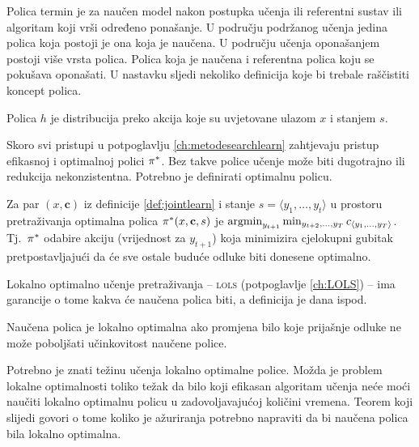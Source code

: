 Polica  termin je za naučen model nakon postupka učenja ili
referentni sustav ili algoritam koji vrši određeno ponašanje. U području
podržanog učenja jedina polica koja postoji je ona koja je naučena. U području
učenja oponašanjem  postoji više vrsta polica. Polica
koja je naučena i referentna polica koju se pokušava oponašati. U nastavku
sljedi nekoliko definicija koje bi trebale raščistiti koncept polica.

\begin{definition}[Polica]

  Polica $h$ je distribucija preko akcija koje su uvjetovane ulazom $x$ i
  stanjem $s$.

\end{definition}

\noindent
Skoro svi pristupi u potpoglavlju \ref{ch:metodesearchlearn} zahtjevaju pristup
efikasnoj i optimalnoj polici $\pi\ssymbol{1}$. Bez takve police učenje može
biti dugotrajno ili redukcija nekonzistentna. Potrebno je definirati optimalnu
policu.

\begin{definition}

  Za par $(x, \mathbf{c})$ iz definicije \ref{def:jointlearn} i stanje $s =
  \langle y_1, \ldots, y_t \rangle$ u prostoru pretraživanja optimalna polica
  $\pi\ssymbol{1}(x, \mathbf{c}, s)$ je $\operatorname*{argmin}_{y_{t+1}} \min_{y_{t+2},
  \ldots, y_T} c_{\langle y_1, \ldots, y_T \rangle}$. Tj.~$\pi\ssymbol{1}$
  odabire akciju (vrijednost za $y_{t+1}$) koja minimizira cjelokupni gubitak
  pretpostavljajući da će sve ostale buduće odluke biti donesene optimalno.

\end{definition}

\noindent
Lokalno optimalno učenje pretraživanja -- \textsc{lols} (potpoglavlje
\ref{ch:LOLS}) --  ima garancije o tome kakva će naučena polica biti, a
definicija je dana ispod.

\begin{definition}

  Naučena polica je lokalno optimalna ako promjena bilo koje prijašnje odluke ne
  može poboljšati učinkovitost naučene police.

\end{definition}

\noindent
Potrebno je znati težinu učenja lokalno optimalne police. Možda je problem
lokalne optimalnosti toliko težak da bilo koji efikasan algoritam učenja neće
moći naučiti lokalno optimalnu policu u zadovoljavajućoj količini vremena.
Teorem koji slijedi govori o tome koliko je ažuriranja potrebno napraviti da bi
naučena polica bila lokalno optimalna.

